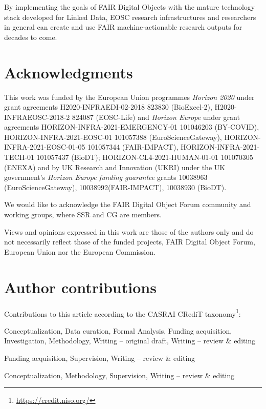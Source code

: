 \documentclass[fleqn,10pt,lineno]{wlpeerjlua}
\providecommand{\tightlist}{%
  \setlength{\itemsep}{0pt}\setlength{\parskip}{0pt}}
\begin{document}
By implementing the goals of FAIR Digital Objects with the mature technology stack developed for Linked Data, EOSC research infrastructures and researchers in general can create and use FAIR machine-actionable research outputs for decades to come.

\section*{Acknowledgments}

\begin{small}
This work was funded by the European Union programmes \emph{Horizon 2020} under grant agreements H2020-INFRAEDI-02-2018 823830 (BioExcel-2), H2020-INFRAEOSC-2018-2 824087 (EOSC-Life) and \emph{Horizon Europe} under grant agreements HORIZON-INFRA-2021-EMERGENCY-01 101046203 (BY-COVID), HORIZON-INFRA-2021-EOSC-01 101057388 (EuroScienceGateway), HORIZON-INFRA-2021-EOSC-01-05 101057344 (FAIR-IMPACT), HORIZON-INFRA-2021-TECH-01 101057437 (BioDT);  HORIZON-CL4-2021-HUMAN-01-01 101070305 (ENEXA)  and by UK Research and Innovation (UKRI) under the UK government’s \emph{Horizon Europe funding guarantee} grants 10038963 (EuroScienceGateway), 10038992(FAIR-IMPACT), 10038930 (BioDT).
\end{small}

We would like to acknowledge the FAIR Digital Object Forum \autocite{FAIRDigitalObjects} community and working groups, where SSR and CG are members. 

Views and opinions expressed in this work are those of the authors only and do not necessarily reflect those of the funded projects, FAIR Digital Object Forum, European Union nor the European Commission. 


\section*{Author contributions}
\begin{small}

Contributions to this article according to the CASRAI CRediT taxonomy\footnote{\url{https://credit.niso.org/}}:

\begin{description}
\tightlist
\item[Stian Soiland-Reyes]
Conceptualization, Data curation, Formal Analysis, Funding acquisition, Investigation, Methodology,
Writing -- original draft, Writing -- review \& editing
\item[Carole Goble]
Funding acquisition, Supervision, Writing -- review \& editing
\item[Paul Groth]
Conceptualization, Methodology, Supervision, Writing -- review \& editing
\end{description}
\end{small}
\end{document}

